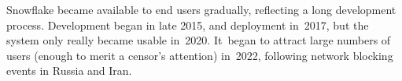 \documentclass[letterpaper,twocolumn]{article}
\begin{document}

Snowflake became available to end users gradually,
reflecting a long development process.
Development began in late 2015,
and deployment in~2017,
but the system only really became usable in~2020.
It~began to attract large numbers of users
(enough to merit a censor's attention)
in~2022, following
network blocking events in Russia and Iran.
\end{document}
